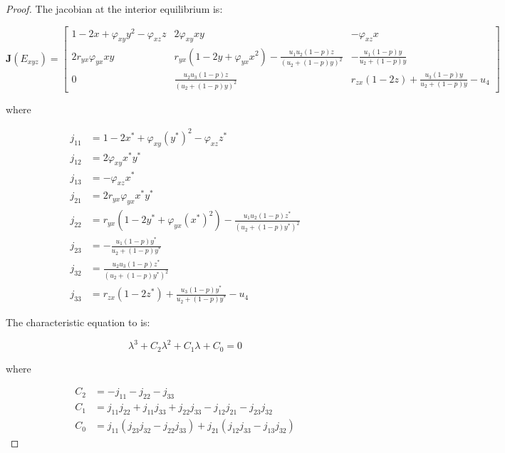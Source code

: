 \begin{proof}
    The jacobian at the interior equilibrium is:

    \begin{equation}\label{matrix:jacobian-interior}
        \textbf{J}\left(E_{xyz}\right) = \begin{bmatrix}
            1-2x+\varphi_{xy}y^2-\varphi_{xz}z & 2\varphi_{xy}xy & -\varphi_{xz}x\\
            2r_{yx}\varphi_{yx}xy & r_{yx}\left(1-2y+\varphi_{yx}x^2\right)-\frac{u_1u_2\left(1-p\right)z}{\left(u_2+\left(1-p\right)y\right)^2} & -\frac{u_1\left(1-p\right)y}{u_2+\left(1-p\right)y}\\
            0 & \frac{u_2u_3\left(1-p\right)z}{\left(u_2+\left(1-p\right)y\right)^2} & r_{zx}\left(1-2z\right)+\frac{u_3\left(1-p\right)y}{u_2+\left(1-p\right)y}-u_4
        \end{bmatrix}
    \end{equation}

    where
    
    \begin{align*}
        j_{11} &= 1-2x^*+\varphi_{xy}\left(y^*\right)^2-\varphi_{xz}z^*\\
        j_{12} &= 2\varphi_{xy}x^*y^*\\
        j_{13} &= -\varphi_{xz}x^*\\
        j_{21} &= 2r_{yx}\varphi_{yx}x^*y^*\\
        j_{22} &= r_{yx}\left(1-2y^*+\varphi_{yx}\left(x^*\right)^2\right)-\frac{u_1u_2\left(1-p\right)z^*}{\left(u_2+\left(1-p\right)y^*\right)^2}\\
        j_{23} &= -\frac{u_1\left(1-p\right)y^*}{u_2+\left(1-p\right)y^*}\\
        j_{32} &= \frac{u_2u_3\left(1-p\right)z^*}{\left(u_2+\left(1-p\right)y^*\right)^2}\\
        j_{33} &= r_{zx}\left(1-2z^*\right)+\frac{u_3\left(1-p\right)y^*}{u_2+\left(1-p\right)y^*}-u_4
    \end{align*}

    The characteristic equation to  is:

    \begin{equation*}\label{eq:char-eq-interior}
        \lambda^3+C_2\lambda^2+C_1\lambda+C_0=0
    \end{equation*}

    where
    
    \begin{align*}
        C_2 &= -j_{11}-j_{22}-j_{33}\\
        C_1 &= j_{11}j_{22}+j_{11}j_{33}+j_{22}j_{33}-j_{12}j_{21}-j_{23}j_{32}\\
        C_0 &= j_{11}\left(j_{23}j_{32}-j_{22}j_{33}\right)+j_{21}\left(j_{12}j_{33}-j_{13}j_{32}\right)
    \end{align*}


\end{proof}
